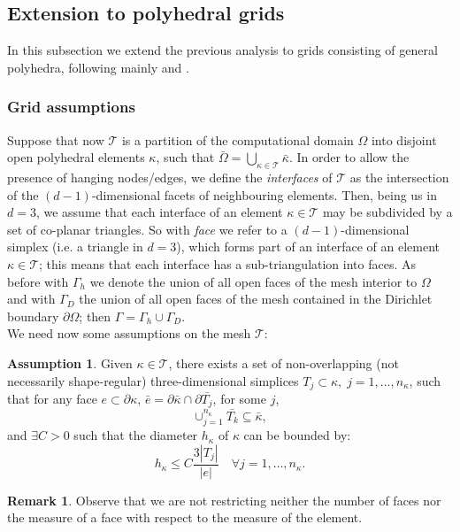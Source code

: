 \documentclass[12pt, a4paper]{article}
\theoremstyle{definition}
\newtheorem{ipotesi}{Assumption}
\theoremstyle{plain}
\theoremstyle{plain}
\theoremstyle{definition}
\newtheorem*{remark}{Remark}
\begin{document}
\subsection{Extension to polyhedral grids}\label{sec:poly}
In this subsection we extend the previous analysis to grids consisting of 
general polyhedra, following mainly \cite{multigrid} and \cite{hpmet}.
\subsubsection{Grid assumptions}
Suppose that now $\mathcal{T}$ is a partition of the computational domain 
$\Omega$ into disjoint open polyhedral elements $\kappa$, such that 
$\bar{\Omega} = \bigcup_{\kappa \in \mathcal{T}} \bar{\kappa}$. In order to 
allow the presence of hanging nodes/edges, we define the \textit{interfaces} of 
$\mathcal{T}$  as the intersection of the $(d-1)$-dimensional facets of 
neighbouring elements. Then, being us in $d=3$, we assume that each interface 
of an element $\kappa \in \mathcal{T}$ may be subdivided by a set of co-planar 
triangles. So with \textit{face} we refer to a $(d-1)$-dimensional simplex 
(i.e. a triangle in $d=3$), which forms part of an interface of an element 
$\kappa \in \mathcal{T}$; this means that each interface has a 
sub-triangulation into faces. As before with $\Gamma_h$ we denote the union of 
all open faces of the mesh interior to $\Omega$ and with $\Gamma_D$ the union 
of all open faces of the mesh contained in the Dirichlet boundary $\partial \Omega$; then 
$\Gamma = \Gamma_h \cup \Gamma_D$.\\
We need now some assumptions on the mesh $\mathcal{T}$:
\begin{ipotesi} \label{ipo:ipo1}
	Given $\kappa \in \mathcal{T}$, there exists a set of non-overlapping (not 
	necessarily shape-regular) three-dimensional simplices $T_j \subset \kappa, 
	\; j = 1,\dots, n_\kappa$, such that for any face $e \subset \partial 
	\kappa$, $\bar{e} = \partial \bar{\kappa} \cap \partial \bar{T_j}$, for 
	some $j$,
	\begin{equation*}
		\cup_{j = 1}^{n_\kappa} \bar{T_k} \subseteq \bar{\kappa},
	\end{equation*}
	and  $\exists C > 0$ such that the diameter $h_\kappa$ of $\kappa$ can be bounded by:
	\begin{equation*}
		h_\kappa \leq C \frac{3 |T_j|}{|e|} \quad \forall j = 1,\dots,n_\kappa.
	\end{equation*}
\end{ipotesi}
\begin{remark}
	Observe that we are not restricting neither the number of faces nor the 
	measure of a face with respect to the measure of the element.
\end{remark}
\end{document}
